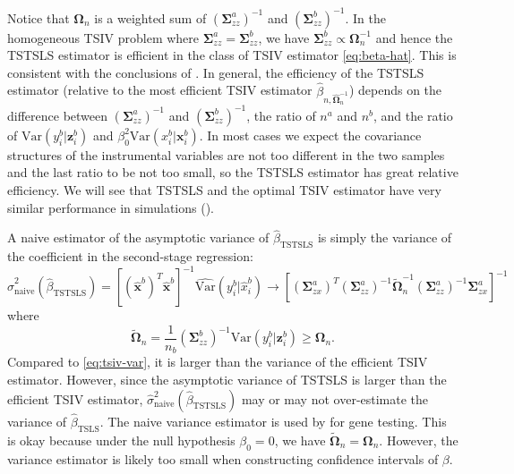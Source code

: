 \documentclass[preprint]{imsart}
\begin{document}
\begin{remark} \label{rem:efficiency}
  Notice that $\bm{\Omega}_n$ is a weighted sum of
  $(\bm{\Sigma}_{zz}^a)^{-1}$ and
  $(\bm{\Sigma}_{zz}^b)^{-1}$. In the homogeneous TSIV problem where $\bm{\Sigma}_{zz}^a =
  \bm{\Sigma}_{zz}^b$, we have $\bm{\Sigma}_{zz}^b
  \propto \bm{\Omega}_n^{-1}$ and hence the TSTSLS estimator is
  efficient in the class of TSIV estimator \eqref{eq:beta-hat}. This
  is consistent with the conclusions of \citet[Theorem
  1]{inoue2010two}. In general, the efficiency of the TSTSLS
  estimator (relative to the most efficient TSIV estimator
  $\hat{\beta}_{n,\hat{\bm{\Omega}}_n^{-1}}$) depends on the
  difference between $(\bm{\Sigma}_{zz}^a)^{-1}$ and
  $(\bm{\Sigma}_{zz}^b)^{-1}$, the ratio of $n^a$ and $n^b$, and the
  ratio of $\mathrm{Var}(y_i^b|\mathbf{z}_i^b)$ and
  $\beta_0^2\mathrm{Var}(x_i^b|\mathbf{x}_i^b)$. In
  most cases we expect the covariance
  structures of the instrumental variables are not too different in
  the two samples and the last ratio to be not too small, so the
  TSTSLS estimator has great relative efficiency. We will see that
  TSTSLS and the optimal TSIV estimator have very similar performance
  in simulations ().
\end{remark}

\begin{remark}
  A naive estimator of the asymptotic variance of $\hat{\beta}_{\text{TSTSLS}}$
  is simply the variance of the coefficient in the second-stage regression:
  \[
  \hat{\sigma}^2_{\text{naive}}(\hat{\beta}_{\text{TSTSLS}}) = [(\hat{\mathbf{x}}^b)^T
  \hat{\mathbf{x}}^b]^{-1} \widehat{\mathrm{Var}}(y_i^b|\hat{x}^b_i) \to
  [(\bm{\Sigma}^a_{zx})^T (\bm{\Sigma}^a_{zz})^{-1} \tilde{\bm{\Omega}}_n^{-1}
  (\bm{\Sigma}^a_{zz})^{-1} \bm{\Sigma}^a_{zx}]^{-1}
  \]
  where
  \[
  \tilde{\bm{\Omega}}_n = \frac{1}{n_b}
  (\bm{\Sigma}^b_{zz})^{-1}\mathrm{Var}(y_i^b|\mathbf{z}_i^b) \ge \bm{\Omega}_n.
  \]
  Compared to \eqref{eq:tsiv-var}, it is larger
  than the variance of the efficient TSIV estimator. However, since
  the asymptotic variance of TSTSLS is larger than the efficient TSIV
  estimator, $\hat{\sigma}^2_{\text{naive}}(\hat{\beta}_{\text{TSTSLS}})$ may or may
  not over-estimate the variance of $\hat{\beta}_{\text{TSLS}}$. The naive
  variance estimator is used by \citet{gamazon2015gene} for gene
  testing. This is okay because under the null hypothesis $\beta_0 = 0$,
  we have $\tilde{\bm \Omega}_n = \bm \Omega_n$. However, the variance
  estimator is likely too small when constructing confidence intervals
  of $\beta$.
\end{remark}
\end{document}
